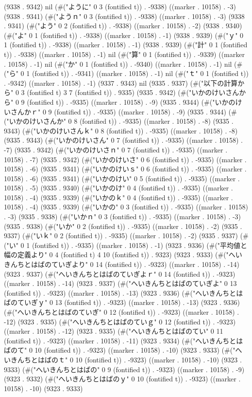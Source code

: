 {(9338 . 9342) nil (#("ように" 0 3 (fontified t)) . -9338) ((marker . 10158) . -3) (9338 . 9341) (#("ようｎ" 0 3 (fontified t)) . -9338) ((marker . 10158) . -3) (9338 . 9341) (#("よう" 0 2 (fontified t)) . -9338) ((marker . 10158) . -2) (9338 . 9340) (#("よ" 0 1 (fontified t)) . -9338) ((marker . 10158) . -1) (9338 . 9339) (#("ｙ" 0 1 (fontified t)) . -9338) ((marker . 10158) . -1) (9338 . 9339) (#("計" 0 1 (fontified t)) . -9338) ((marker . 10158) . -1) nil (#("算" 0 1 (fontified t)) . -9339) ((marker . 10158) . -1) nil (#("か" 0 1 (fontified t)) . -9340) ((marker . 10158) . -1) nil (#("ら" 0 1 (fontified t)) . -9341) ((marker . 10158) . -1) nil (#("ｔ" 0 1 (fontified t)) . -9342) ((marker . 10158) . -1) (9337 . 9343) nil (9335 . 9337) (#("以下の計算から" 0 3 (fontified t) 3 7 (fontified t)) . 9335) (9335 . 9342) (#("いかのけいさんから" 0 9 (fontified t)) . -9335) ((marker . 10158) . -9) (9335 . 9344) (#("いかのけいさんかｒ" 0 9 (fontified t)) . -9335) ((marker . 10158) . -9) (9335 . 9344) (#("いかのけいさんか" 0 8 (fontified t)) . -9335) ((marker . 10158) . -8) (9335 . 9343) (#("いかのけいさんｋ" 0 8 (fontified t)) . -9335) ((marker . 10158) . -8) (9335 . 9343) (#("いかのけいさん" 0 7 (fontified t)) . -9335) ((marker . 10158) . -7) (9335 . 9342) (#("いかのけいさｎ" 0 7 (fontified t)) . -9335) ((marker . 10158) . -7) (9335 . 9342) (#("いかのけいさ" 0 6 (fontified t)) . -9335) ((marker . 10158) . -6) (9335 . 9341) (#("いかのけいｓ" 0 6 (fontified t)) . -9335) ((marker . 10158) . -6) (9335 . 9341) (#("いかのけい" 0 5 (fontified t)) . -9335) ((marker . 10158) . -5) (9335 . 9340) (#("いかのけ" 0 4 (fontified t)) . -9335) ((marker . 10158) . -4) (9335 . 9339) (#("いかのｋ" 0 4 (fontified t)) . -9335) ((marker . 10158) . -4) (9335 . 9339) (#("いかの" 0 3 (fontified t)) . -9335) ((marker . 10158) . -3) (9335 . 9338) (#("いかｎ" 0 3 (fontified t)) . -9335) ((marker . 10158) . -3) (9335 . 9338) (#("いか" 0 2 (fontified t)) . -9335) ((marker . 10158) . -2) (9335 . 9337) (#("いｋ" 0 2 (fontified t)) . -9335) ((marker . 10158) . -2) (9335 . 9337) (#("い" 0 1 (fontified t)) . -9335) ((marker . 10158) . -1) (9323 . 9336) (#("平均値と幅の定義より" 0 4 (fontified t) 4 10 (fontified t)) . 9323) (9323 . 9333) (#("へいきんちとはばのていぎより" 0 14 (fontified t)) . -9323) ((marker . 10158) . -14) (9323 . 9337) (#("へいきんちとはばのていぎよｒ" 0 14 (fontified t)) . -9323) ((marker . 10158) . -14) (9323 . 9337) (#("へいきんちとはばのていぎよ" 0 13 (fontified t)) . -9323) ((marker . 10158) . -13) (9323 . 9336) (#("へいきんちとはばのていぎｙ" 0 13 (fontified t)) . -9323) ((marker . 10158) . -13) (9323 . 9336) (#("へいきんちとはばのていぎ" 0 12 (fontified t)) . -9323) ((marker . 10158) . -12) (9323 . 9335) (#("へいきんちとはばのていｇ" 0 12 (fontified t)) . -9323) ((marker . 10158) . -12) (9323 . 9335) (#("へいきんちとはばのてい" 0 11 (fontified t)) . -9323) ((marker . 10158) . -11) (9323 . 9334) (#("へいきんちとはばのて" 0 10 (fontified t)) . -9323) ((marker . 10158) . -10) (9323 . 9333) (#("へいきんちとはばのｔ" 0 10 (fontified t)) . -9323) ((marker . 10158) . -10) (9323 . 9333) (#("へいきんちとはばの" 0 9 (fontified t)) . -9323) ((marker . 10158) . -9) (9323 . 9332) (#("へいきんちとはばのｙ" 0 10 (fontified t)) . -9323) ((marker . 10158) . -10) (9323 . 9333) }
